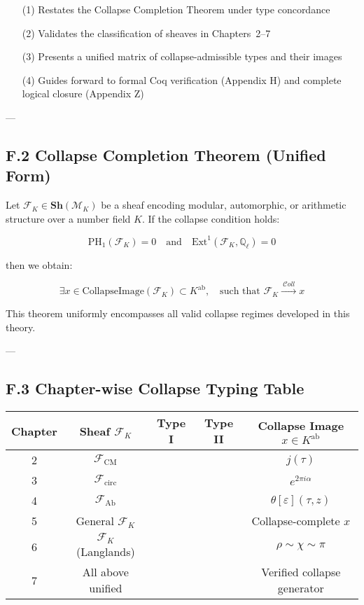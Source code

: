 \documentclass[11pt]{article}
\newcommand{\cmark}{\ding{51}}  %
\begin{document}
\begin{itemize}
    \item[(1)] Restates the Collapse Completion Theorem under type concordance
    \item[(2)] Validates the classification of sheaves in Chapters~2–7
    \item[(3)] Presents a unified matrix of collapse-admissible types and their images
    \item[(4)] Guides forward to formal Coq verification (Appendix H) and complete logical closure (Appendix Z)
\end{itemize}

---

\subsection*{F.2 Collapse Completion Theorem (Unified Form)}

Let \( \mathcal{F}_K \in \mathbf{Sh}(\mathcal{M}_K) \) be a sheaf encoding modular, automorphic, or arithmetic structure over a number field \( K \).  
If the collapse condition holds:

\[
\mathrm{PH}_1(\mathcal{F}_K) = 0 \quad \text{and} \quad \mathrm{Ext}^1(\mathcal{F}_K, \mathbb{Q}_\ell) = 0
\]

then we obtain:

\[
\exists x \in \text{CollapseImage}(\mathcal{F}_K) \subset K^{\mathrm{ab}}, \quad \text{such that } \mathcal{F}_K \xrightarrow{\ \mathcal{C}oll\ } x
\]

This theorem uniformly encompasses all valid collapse regimes developed in this theory.

---

\subsection*{F.3 Chapter-wise Collapse Typing Table}

\begin{center}
\renewcommand{\arraystretch}{1.3}
\begin{tabular}{|c|c|c|c|c|}
\hline
\textbf{Chapter} & \textbf{Sheaf \( \mathcal{F}_K \)} & \textbf{Type I} & \textbf{Type II} & \textbf{Collapse Image} \( x \in K^{\mathrm{ab}} \) \\
\hline
2 & \( \mathcal{F}_{\mathrm{CM}} \) & \cmark & \cmark & \( j(\tau) \) \\
3 & \( \mathcal{F}_{\mathrm{circ}} \) & \cmark & \cmark & \( e^{2\pi i \alpha} \) \\
4 & \( \mathcal{F}_{\mathrm{Ab}} \) & \cmark & \cmark & \( \theta[\varepsilon](\tau, z) \) \\
5 & General \( \mathcal{F}_K \) & \cmark & \cmark & Collapse-complete \( x \) \\
6 & \( \mathcal{F}_K \) (Langlands) & \cmark & \cmark & \( \rho \sim \chi \sim \pi \) \\
7 & All above unified & \cmark & \cmark & Verified collapse generator \\
\hline
\end{tabular}
\end{center}
\end{document}
